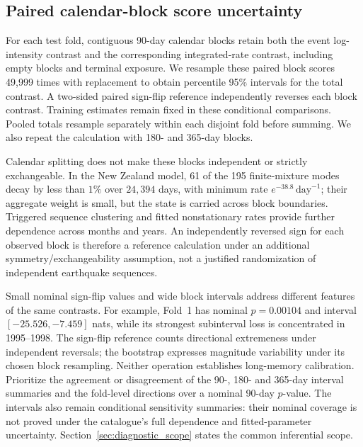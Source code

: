 \subsection{Paired calendar-block score uncertainty}
\label{sec:block_score_uncertainty}
For each test fold, contiguous 90-day calendar blocks retain both the event
log-intensity contrast and the corresponding integrated-rate contrast,
including empty blocks and terminal exposure. We resample these paired block
scores 49,999 times with replacement to obtain percentile 95\% intervals for
the total contrast. A two-sided paired sign-flip reference independently
reverses each block contrast. Training estimates remain fixed in these
conditional comparisons. Pooled totals resample separately within each disjoint
fold before summing. We also repeat the calculation with 180- and 365-day blocks.

Calendar splitting does not make these blocks independent or strictly
exchangeable. In the New Zealand model, 61 of the 195 finite-mixture modes
decay by less than $1\%$ over $24{,}394$ days, with minimum rate
$e^{-38.8}\,\mathrm{day}^{-1}$; their aggregate weight is small, but the
state is carried across block boundaries. Triggered sequence clustering and
fitted nonstationary rates provide further dependence across months and years.
An independently reversed sign for each observed block is therefore a
reference calculation under an additional symmetry/exchangeability assumption,
not a justified randomization of independent earthquake sequences.

Small nominal sign-flip values and wide block intervals address different
features of the same contrasts. For example, Fold~1 has nominal $p=0.00104$
and interval $[-25.526,-7.459]$ nats, while its strongest subinterval loss is
concentrated in 1995--1998. The sign-flip reference counts directional
extremeness under independent reversals; the bootstrap expresses magnitude
variability under its chosen block resampling. Neither operation establishes
long-memory calibration. Prioritize the agreement or disagreement of the
90-, 180- and 365-day interval summaries and the fold-level directions over a
nominal 90-day $p$-value. The intervals also remain conditional sensitivity
summaries: their nominal coverage is not proved under the catalogue's full
dependence and fitted-parameter uncertainty. Section~\ref{sec:diagnostic_scope}
states the common inferential scope.

